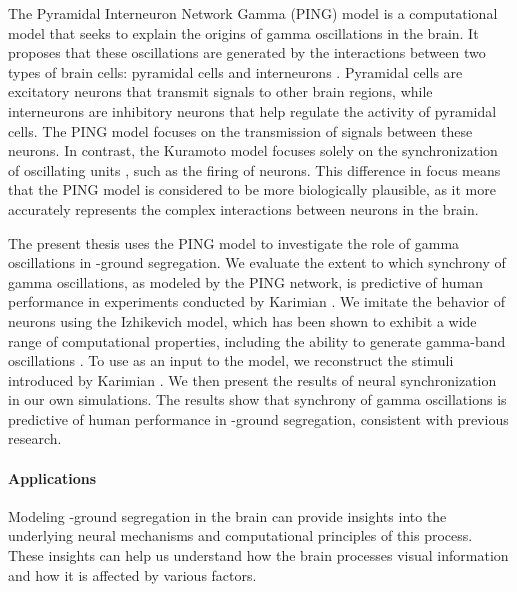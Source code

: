 The Pyramidal Interneuron Network Gamma (PING) model is a computational model that seeks to explain the origins of gamma oscillations in the brain. It proposes that these oscillations are generated by the interactions between two types of brain cells: pyramidal cells and interneurons \cite{Wilson1972, Whittington2000, Hansel2003}. Pyramidal cells are excitatory neurons that transmit signals to other brain regions, while interneurons are inhibitory neurons that help regulate the activity of pyramidal cells. The PING model focuses on the transmission of signals between these neurons. In contrast, the Kuramoto model focuses solely on the synchronization of oscillating units \cite{Breakspear2010}, such as the firing of neurons. This difference in focus means that the PING model is considered to be more biologically plausible, as it more accurately represents the complex interactions between neurons in the brain.

The present thesis uses the PING model to investigate the role of gamma oscillations in \stimfig-ground segregation. We evaluate the extent to which synchrony of gamma oscillations, as modeled by the PING network, is predictive of human performance in experiments conducted by Karimian \cite{MaryamPLACEHOLDER}. 
We imitate the behavior of neurons using the Izhikevich model, which has been shown to exhibit a wide range of computational properties, including the ability to generate gamma-band oscillations \cite{Izhikevich2003}. To use as an input to the model, we reconstruct the stimuli introduced by Karimian \cite{MaryamPLACEHOLDER}. We then present the results of neural synchronization in our own simulations. The results show that synchrony of gamma oscillations is predictive of human performance in \stimfig-ground segregation, consistent with previous research.

\paragraph{Applications}

Modeling \stimfig-ground segregation in the brain can provide insights into the underlying neural mechanisms and computational principles of this process. These insights can help us understand how the brain processes visual information and how it is affected by various factors.

